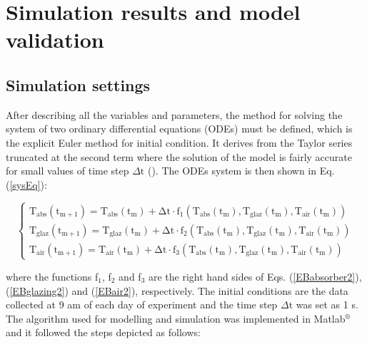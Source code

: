 \section{Simulation results and model validation}

\subsection{Simulation settings}

After describing all the variables and parameters, the method for solving the system of two ordinary differential equations (ODEs) must be defined, which is the explicit Euler method for initial condition. It derives from the Taylor series truncated at the second term where the solution of the model is fairly accurate for small values of time step $\Delta \mathrm{t}$ (\cite{Hoffman2001}). The ODEs system is then shown in Eq. (\ref{sysEq}):

\vspace{-0.75cm}
\begin{equation}
\left\{ \begin{array}{l}
\mathrm{{T_{abs}}({t_{m + 1}}) = {T_{abs}}({t_m}) + \Delta t \cdot {f_1}({T_{abs}}({t_m}),{T_{glaz}}({t_m}),{T_{air}}({t_m}))}\\
\mathrm{{T_{glaz}}({t_{m + 1}}) = {T_{glaz}}({t_m}) + \Delta t \cdot {f_2}({T_{abs}}({t_m}),{T_{glaz}}({t_m}),{T_{air}}({t_m}))}\\
\mathrm{{T_{air}}({t_{m + 1}}) = {T_{air}}({t_m}) + \Delta t \cdot {f_3}({T_{abs}}({t_m}),{T_{glaz}}({t_m}),{T_{air}}({t_m}))      }
\end{array} \right.
\label{sysEq}
\end{equation}

\noindent where the functions f$_1$, f$_2$ and f$_3$ are the right hand sides of Eqs. (\ref{EBabsorber2}), (\ref{EBglazing2}) and (\ref{EBair2}), respectively. The initial conditions are the data collected at 9 am of each day of experiment and the time step $\Delta \mathrm{t}$ was set as 1 s. The algorithm used for modelling and simulation was implemented in Matlab$^{\circledR}$ and it followed the steps depicted as follows:



